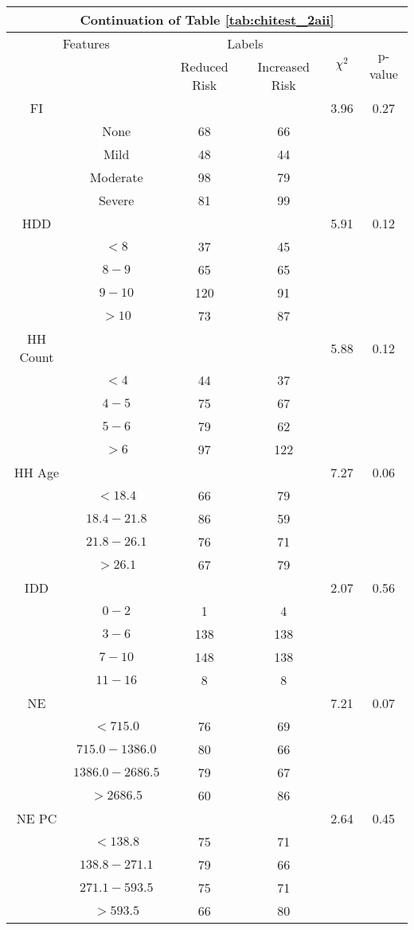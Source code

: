 \begin{table}
\centering
\label{tab:chitest_2aii_cont}
\begin{tabular}{c c | c c| c | c}
\hline
\multicolumn{6}{c}{Continuation of Table \ref{tab:chitest_2aii}}\\ 
\hline
\multicolumn{2}{c|}{Features}& \multicolumn{2}{c|}{Labels}& \multirow{2}{*}{$\chi^2$} & \multirow{2}{*}{p-value}\\ 
& & Reduced Risk & Increased Risk & & \\ 
\hline
FI &  &  & & 3.96 & 0.27 \\ 
& None & 68 & 66& & \\ 
& Mild & 48 & 44& & \\ 
& Moderate & 98 & 79& & \\ 
& Severe & 81 & 99& & \\ 
\hline 
HDD &  &  & & 5.91 & 0.12 \\ 
& $< 8$ & 37 & 45& & \\ 
& $8-9$ & 65 & 65& & \\ 
& $9-10$ & 120 & 91& & \\ 
& $> 10$ & 73 & 87& & \\ 
\hline 
HH Count &  &  & & 5.88 & 0.12 \\ 
& $< 4$ & 44 & 37& & \\ 
& $4-5$ & 75 & 67& & \\ 
& $5-6$ & 79 & 62& & \\ 
& $> 6$ & 97 & 122& & \\ 
\hline 
HH Age &  &  & & 7.27 & 0.06 \\ 
& $< 18.4$ & 66 & 79& & \\ 
& $18.4-21.8$ & 86 & 59& & \\ 
& $21.8-26.1$ & 76 & 71& & \\ 
& $> 26.1$ & 67 & 79& & \\ 
\hline 
IDD &  &  & & 2.07 & 0.56 \\ 
& $0-2$ & 1 & 4& & \\ 
& $3-6$ & 138 & 138& & \\ 
& $7-10$ & 148 & 138& & \\ 
& $11-16$ & 8 & 8& & \\ 
\hline 
NE &  &  & & 7.21 & 0.07 \\ 
& $< 715.0$ & 76 & 69& & \\ 
& $715.0-1386.0$ & 80 & 66& & \\ 
& $1386.0-2686.5$ & 79 & 67& & \\ 
& $> 2686.5$ & 60 & 86& & \\ 
\hline 
NE PC &  &  & & 2.64 & 0.45 \\ 
& $< 138.8$ & 75 & 71& & \\ 
& $138.8-271.1$ & 79 & 66& & \\ 
& $271.1-593.5$ & 75 & 71& & \\ 
& $> 593.5$ & 66 & 80& & \\ 
\hline 
\end{tabular}
\end{table}

